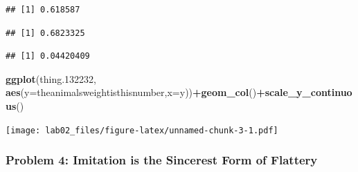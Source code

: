 \documentclass[
]{article}
\newenvironment{Shaded}{\begin{snugshade}}{\end{snugshade}}
\newcommand{\AttributeTok}[1]{\textcolor[rgb]{0.13,0.29,0.53}{#1}}
\newcommand{\ConstantTok}[1]{\textcolor[rgb]{0.56,0.35,0.01}{#1}}
\newcommand{\DecValTok}[1]{\textcolor[rgb]{0.00,0.00,0.81}{#1}}
\newcommand{\FloatTok}[1]{\textcolor[rgb]{0.00,0.00,0.81}{#1}}
\newcommand{\FunctionTok}[1]{\textcolor[rgb]{0.13,0.29,0.53}{\textbf{#1}}}
\newcommand{\NormalTok}[1]{#1}
\newcommand{\OtherTok}[1]{\textcolor[rgb]{0.56,0.35,0.01}{#1}}
\newcommand{\SpecialCharTok}[1]{\textcolor[rgb]{0.81,0.36,0.00}{\textbf{#1}}}
\newcommand{\StringTok}[1]{\textcolor[rgb]{0.31,0.60,0.02}{#1}}
\begin{document}
\begin{Shaded}
\end{Shaded}

\begin{verbatim}
## [1] 0.618587
\end{verbatim}

\begin{verbatim}
## [1] 0.6823325
\end{verbatim}

\begin{verbatim}
## [1] 0.04420409
\end{verbatim}

\begin{Shaded}
\begin{Highlighting}[]
\FunctionTok{ggplot}\NormalTok{(thing}\FloatTok{.132232}\NormalTok{, }\FunctionTok{aes}\NormalTok{(}\AttributeTok{y=}\NormalTok{theanimalsweightisthisnumber,}\AttributeTok{x=}\NormalTok{y))}\SpecialCharTok{+}\FunctionTok{geom\_col}\NormalTok{()}\SpecialCharTok{+}\FunctionTok{scale\_y\_continuous}\NormalTok{()}
\end{Highlighting}
\end{Shaded}

\texttt{[image: lab02\_files/figure-latex/unnamed-chunk-3-1.pdf]}

\hypertarget{problem-4-imitation-is-the-sincerest-form-of-flattery}{%
\subsubsection{Problem 4: Imitation is the Sincerest Form of
Flattery}\label{problem-4-imitation-is-the-sincerest-form-of-flattery}}
\end{document}
